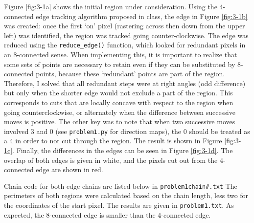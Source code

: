 \documentclass[aps,letterpaper,10pt]{article}
\newcommand{\ttt}{\texttt}
\begin{document}
\vspace{-10px}
Figure \ref{fig:3-1a} shows the initial region under consideration.  Using the 4-connected edge tracking algorithm proposed in class, the edge in Figure \ref{fig:3-1b} was created: once the first `on' pixel (rastering across then down from the upper left) was identified, the region was tracked going counter-clockwise.  The edge was reduced using the \ttt{reduce\_edge()} function, which looked for redundant pixels in an 8-connected sense.  When implementing this, it is important to realize that some sets of points are necessary to retain even if they can be substituted by 8-connected points, because these `redundant' points are part of the region.  Therefore, I solved that all redundant steps were at right angles (odd difference) but only when the shorter edge would not exclude a part of the region.  This corresponds to cuts that are locally concave with respect to the region when going counterclockwise, or alternately when the difference between successive moves is positive.  The other key was to note that when two successive moves involved 3 and 0 (see \ttt{problem1.py} for direction maps), the 0 should be treated as a 4 in order to not cut through the region.  The result is shown in Figure \ref{fig:3-1c}.  Finally, the differences in the edges can be seen in Figure \ref{fig:3-1d}.  The overlap of both edges is given in white, and the pixels cut out from the 4-connected edge are shown in red.

Chain code for both edge chains are listed below in \ttt{problem1chain\#.txt} The perimeters of both regions were calculated based on the chain length, less two for the coordinates of the start pixel.  The results are given in \ttt{problem1.txt}.  As expected, the 8-connected edge is smaller than the 4-connected edge.




\end{document}
